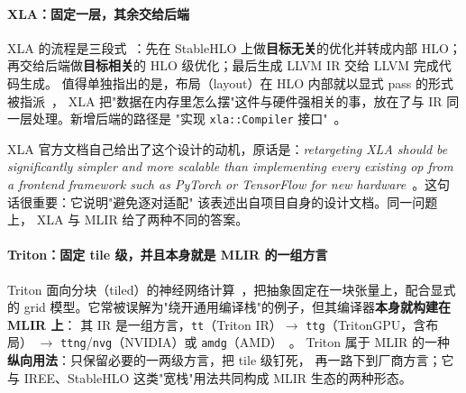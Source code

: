 \paragraph{XLA：固定一层，其余交给后端}
XLA 的流程是三段式~\cite{xlaarch}：先在 StableHLO 上做\textbf{目标无关}的优化并转成内部
HLO；再交给后端做\textbf{目标相关}的 HLO 级优化；最后生成 LLVM IR 交给 LLVM 完成代码生成。
值得单独指出的是，布局（layout）在 HLO 内部就以显式 pass 的形式被指派~\cite{xlathunks}，
XLA 把"数据在内存里怎么摆"这件与硬件强相关的事，放在了与 IR 同一层处理。新增后端的路径是
"实现 \texttt{xla::Compiler} 接口"~\cite{xlabackend}。

XLA 官方文档自己给出了这个设计的动机，原话是：\emph{retargeting XLA should be significantly
simpler and more scalable than implementing every existing op from a frontend framework such as
PyTorch or TensorFlow for new hardware}~\cite{xlabackend}。这句话很重要：它说明"避免逐对适配"
该表述出自项目自身的设计文档。同一问题上，
XLA 与 MLIR 给了两种不同的答案。

\paragraph{Triton：固定 tile 级，并且本身就是 MLIR 的一组方言}
Triton 面向分块（tiled）的神经网络计算~\cite{triton19}，把抽象固定在一块张量上，配合显式的
grid 模型。它常被误解为"绕开通用编译栈"的例子，但其编译器\textbf{本身就构建在 MLIR 上}：
其 IR 是一组方言，\texttt{tt}（Triton IR）$\rightarrow$ \texttt{ttg}（TritonGPU，含布局）
$\rightarrow$ \texttt{ttng}/\texttt{nvg}（NVIDIA）或 \texttt{amdg}（AMD）~\cite{tritondialects}。
Triton 属于 MLIR 的一种\textbf{纵向用法}：只保留必要的一两级方言，把 tile 级钉死，
再一路下到厂商方言；它与 IREE、StableHLO 这类"宽栈"用法共同构成 MLIR 生态的两种形态。

